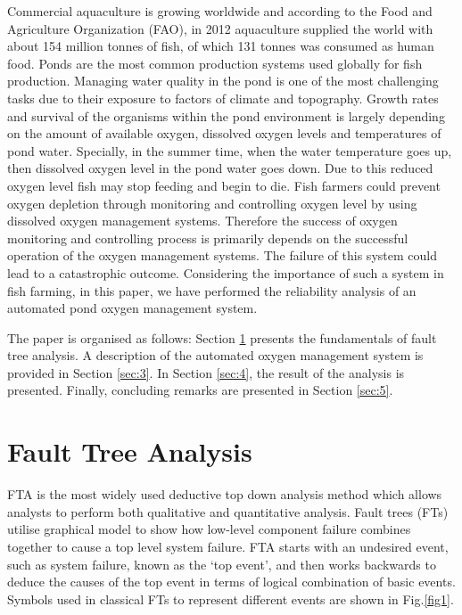 \documentclass[10pt]{llncs}
\begin{document}
Commercial aquaculture is growing worldwide and  according to the Food and Agriculture Organization (FAO), in 2012 aquaculture supplied the world with about 154 million tonnes of fish, of which 131 tonnes was consumed as human food\cite{Fao2012}. Ponds are the most common production systems used globally for fish production. Managing water quality in the pond is one of the most challenging tasks due to their exposure to factors of climate and topography\cite{culberson1996}. Growth rates and survival of the organisms within the pond environment is largely depending on the amount of available oxygen, dissolved oxygen levels and temperatures of pond water\cite{boyd1992, boyd1978}. Specially, in the summer time, when the water temperature goes up, then dissolved oxygen level in the pond water goes down.  Due to this reduced oxygen level fish may stop feeding and begin to die. Fish farmers could prevent oxygen depletion through monitoring and controlling oxygen level by using dissolved oxygen management systems. Therefore the success of oxygen monitoring and controlling process is primarily depends on the successful operation of the oxygen management systems. The failure of this system could lead to a catastrophic outcome. Considering the importance of such a system in fish farming, in this paper, we have performed the reliability analysis of an automated pond oxygen management system.    

The paper is organised as follows: Section \ref{sec:2} presents the fundamentals of fault tree analysis. A description of the automated oxygen management system is provided in Section \ref{sec:3}. In Section \ref{sec:4}, the result of the analysis is presented. Finally, concluding remarks are presented in Section \ref{sec:5}.

\section{Fault Tree Analysis}
\label{sec:2}
FTA is the most widely used deductive top down analysis method which allows analysts to perform both qualitative and quantitative analysis\cite{Alain1991, Vesely2002}. Fault trees (FTs) utilise graphical model to show how low-level component failure combines together to cause a top level system failure. FTA starts with an undesired event, such as system failure, known as the `top event', and then works backwards to deduce the causes of the top event in terms of logical combination of basic events\cite{Martin2009}. Symbols used in classical FTs to represent different events are shown in Fig.\ref{fig1}. 
\end{document}
